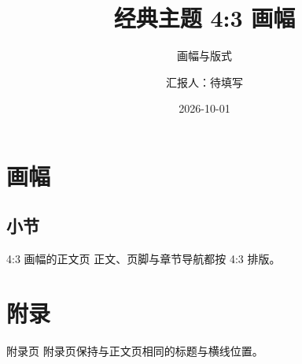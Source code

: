 \documentclass[aspectratio=43,fontset=none]{ctexbeamer}
\title[4:3]{经典主题 4:3 画幅}
\subtitle{画幅与版式}
\author{汇报人：待填写}
\institute{哈尔滨工业大学}
\date{2026-10-01}
\begin{document}
\TitleSlide
\BlueTitleSlide
\OutlineSlide
\section{画幅}
\subsection{小节}
\begin{frame}{4:3 画幅的正文页}
  正文、页脚与章节导航都按 4:3 排版。
\end{frame}
\section{附录}
\begin{frame}{附录页}
  附录页保持与正文页相同的标题与横线位置。
\end{frame}
\end{document}

